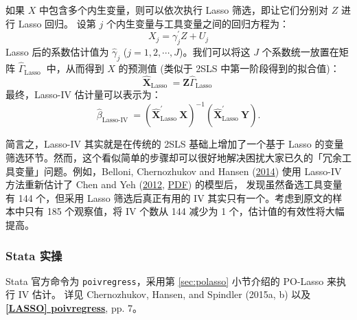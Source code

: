 {如果 $X$ 中包含多个内生变量，则可以依次执行 Lasso 筛选，即让它们分别对 $Z$ 进行 Lasso 回归。
设第 $j$ 个内生变量与工具变量之间的回归方程为：
$$X_{j}=\gamma_{j}^{\prime}Z+U_{j}$$
Lasso 后的系数估计值为 $\widehat{\gamma}_{j}$ ($j=1,2,\cdots,J$)。我们可以将这 $J$ 个系数统一放置在矩阵 $\widehat{\Gamma}_{\text {Lasso }}$ 中，从而得到 $X$ 的预测值 (类似于 2SLS 中第一阶段得到的拟合值)：
$$\widehat{\boldsymbol{X}}_{\text {Lasso }}=\boldsymbol{Z} \widehat{\Gamma}_{\text {Lasso }}$$
最终，Lasso-IV 估计量可以表示为：
$$
\widehat{\beta}_{\text {Lasso-IV }}=\left(\widehat{\boldsymbol{X}}_{\text {Lasso }}^{\prime} \boldsymbol{X}\right)^{-1}\left(\widehat{\boldsymbol{X}}_{\text {Lasso }}^{\prime} \boldsymbol{Y}\right) .
$$

简言之，Lasso-IV 其实就是在传统的 2SLS 基础上增加了一个基于 Lasso 的变量筛选环节。然而，这个看似简单的步骤却可以很好地解决困扰大家已久的「冗余工具变量」问题。例如，Belloni, Chernozhukov and Hansen (\href{https://doi.org/10.1257/jep.28.2.29}{2014})
使用 Lasso-IV 方法重新估计了 Chen and Yeh (\href{https://papers.ssrn.com/sol3/papers.cfm?abstract_id=2977074}{2012}, \href{http://users.nber.org/~dlchen/papers/Growth_Under_the_Shadow_of_Expropriation.pdf}{PDF}) 的模型后，
发现虽然备选工具变量有 144 个，但采用 Lasso 筛选后真正有用的 IV 其实只有一个。考虑到原文的样本中只有 185 个观察值，将 IV 个数从 144 减少为 1 个，估计值的有效性将大幅提高。


\subsubsection{Stata 实操}
Stata 官方命令为 \texttt{poivregress}，采用第 \ref{sec:polasso} 小节介绍的 PO-Lasso 来执行 IV 估计。
详见 Chernozhukov, Hansen, and Spindler (2015a, b) 以及 \href{https://www.stata.com/manuals/lassopoivregress.pdf}{\bfseries{[\MakeUppercase{lasso}] poivregress}}, pp. 7。

}
